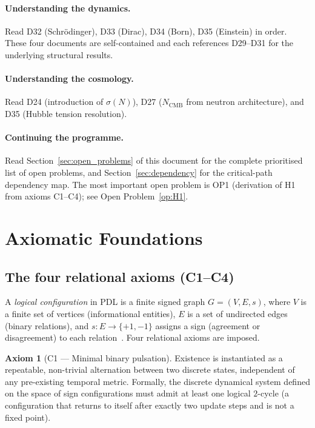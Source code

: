 \documentclass[11pt,a4paper]{article}
\theoremstyle{plain}
\theoremstyle{definition}
\newtheorem{axiom}[theorem]{Axiom}
\theoremstyle{remark}
\newcommand{\sigmaN}{\sigma(N)}
\begin{document}
\paragraph{Understanding the dynamics.}
Read D32 (Schr\"odinger), D33 (Dirac), D34 (Born), D35 (Einstein) in order.
These four documents are self-contained and each references D29--D31 for the underlying structural results.

\paragraph{Understanding the cosmology.}
Read D24 (introduction of $\sigmaN$), D27 ($N_{\mathrm{CMB}}$ from neutron architecture), and D35 (Hubble tension resolution).

\paragraph{Continuing the programme.}
Read Section~\ref{sec:open_problems} of this document for the complete prioritised list of open problems, and Section~\ref{sec:dependency} for the critical-path dependency map.
The most important open problem is OP1 (derivation of H1 from axioms C1--C4); see Open Problem~\ref{op:H1}.

\section{Axiomatic Foundations}
\label{sec:axioms}

\subsection{The four relational axioms (C1--C4)}
\label{subsec:axioms}

A \emph{logical configuration} in PDL is a finite signed graph $G=(V,E,s)$, where $V$ is a finite set of vertices (informational entities), $E$ is a set of undirected edges (binary relations), and $s\colon E\to\{+1,-1\}$ assigns a sign (agreement or disagreement) to each relation~\citep{D01,D02}.
Four relational axioms are imposed.

\begin{axiom}[C1 — Minimal binary pulsation]
Existence is instantiated as a repeatable, non-trivial alternation between two discrete states, independent of any pre-existing temporal metric.
Formally, the discrete dynamical system defined on the space of sign configurations must admit at least one logical $2$-cycle (a configuration that returns to itself after exactly two update steps and is not a fixed point).
\end{axiom}
\end{document}
